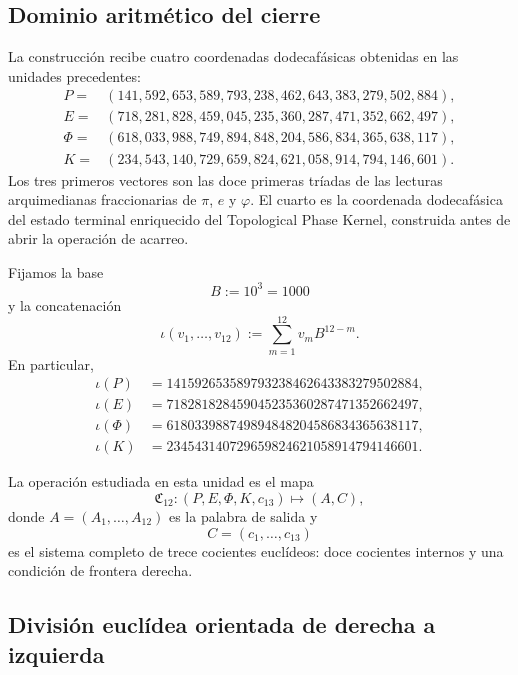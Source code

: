 \subsection{Dominio aritmético del cierre}

La construcción recibe cuatro coordenadas dodecafásicas obtenidas en las
unidades precedentes:
\[
\begin{aligned}
 P={}&(141,592,653,589,793,238,462,643,383,279,502,884),\\
 E={}&(718,281,828,459,045,235,360,287,471,352,662,497),\\
 \Phi={}&(618,033,988,749,894,848,204,586,834,365,638,117),\\
 K={}&(234,543,140,729,659,824,621,058,914,794,146,601).
\end{aligned}
\]
Los tres primeros vectores son las doce primeras tríadas de las lecturas
arquimedianas fraccionarias de \(\pi\), \(e\) y \(\varphi\). El cuarto es
la coordenada dodecafásica del estado terminal enriquecido del Topological
Phase Kernel, construida antes de abrir la operación de acarreo.

Fijamos la base
\[
 B:=10^3=1000
\]
y la concatenación
\begin{equation}
 \iota(v_1,\ldots,v_{12})
 :=\sum_{m=1}^{12}v_mB^{12-m}.
 \label{p12-83-c10-s2:eq:concatenacion-base-mil-alpha}
\end{equation}
En particular,
\[
\begin{aligned}
 \iota(P)&=141592653589793238462643383279502884,\\
 \iota(E)&=718281828459045235360287471352662497,\\
 \iota(\Phi)&=618033988749894848204586834365638117,\\
 \iota(K)&=234543140729659824621058914794146601.
\end{aligned}
\]

La operación estudiada en esta unidad es el mapa
\begin{equation}
 \mathfrak C_{12}:
 (P,E,\Phi,K,c_{13})
 \longmapsto(A,C),
 \label{p12-83-c10-s2:eq:mapa-cierre-dodecafasico-alpha}
\end{equation}
donde \(A=(A_1,\ldots,A_{12})\) es la palabra de salida y
\[
 C=(c_1,\ldots,c_{13})
\]
es el sistema completo de trece cocientes euclídeos: doce cocientes
internos y una condición de frontera derecha.

\subsection{División euclídea orientada de derecha a izquierda}

